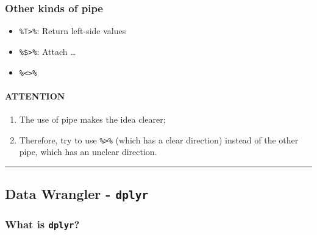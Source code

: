 \documentclass[
]{article}
\begin{document}
\hypertarget{other-kinds-of-pipe}{%
\subsubsection{Other kinds of pipe}\label{other-kinds-of-pipe}}

\begin{itemize}
\item
  \texttt{\%T\textgreater{}\%}: Return left-side values
\end{itemize}

\begin{itemize}
\item
  \texttt{\%\$\textgreater{}\%}: Attach \ldots{}
\end{itemize}

\begin{itemize}
\item
  \texttt{\%\textless{}\textgreater{}\%}
\end{itemize}

\hypertarget{attention}{%
\paragraph{\texorpdfstring{\textbf{ATTENTION}}{ATTENTION}}\label{attention}}

\begin{enumerate}
\def\labelenumi{\arabic{enumi}.}
\item
  The use of pipe makes the idea clearer;
\item
  Therefore, try to use \texttt{\%\textgreater{}\%} (which has a clear
  direction) instead of the other pipe, which has an unclear direction.
\end{enumerate}

\begin{center}\rule{0.5\linewidth}{0.5pt}\end{center}

\hypertarget{data-wrangler---dplyr}{%
\subsection{\texorpdfstring{Data Wrangler -
\texttt{dplyr}}{Data Wrangler - dplyr}}\label{data-wrangler---dplyr}}

\hypertarget{what-is-dplyr}{%
\subsubsection{\texorpdfstring{What is
\texttt{dplyr}?}{What is dplyr?}}\label{what-is-dplyr}}
\end{document}
